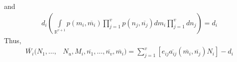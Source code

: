 \documentclass{amsart}
\theoremstyle{definition}
\theoremstyle{remark}
\numberwithin{equation}{section}
\begin{document}
and
\begin{align*}
	d_i\left(\int\limits_{\mathbb{R}^{v+1}}p(m_i, \overline{m_i})\prod\limits_{j = 1}^{v}p(n_j, \overline{n_j})dm_i\prod\limits_{j = 1}^{v}dn_j\right) = d_i
\end{align*}
Thus,
\begin{align*}
	\overline{W_i}(N_1, \dots, &N_u, M_i, \overline{n_1}, \dots, \overline{n_v}, \overline{m_i}) = \sum\limits_{j = 1}^{v}\left[e_{ij}\overline{a_{ij}}(\overline{m_i}, \overline{n_j})N_i\right] - d_i
\end{align*}
\end{document}
